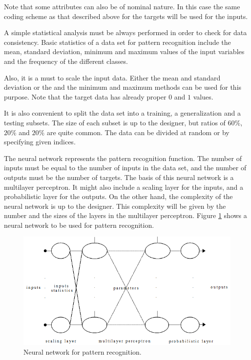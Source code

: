Note that some attributes can also be of nominal nature. 
In this case the same coding scheme as that described above for the targets will be used for the inputs. 

A simple statistical analysis must be always performed in order to check
for data consistency. Basic statistics of a data set for pattern recognition include the
mean, standard deviation, minimum and maximum values of the input variables and the frequency of the different classes. 

Also, it is a must to scale the input data. 
Either the mean and standard deviation or the and the minimum and maximum methods can be used for this purpose. 
Note that the target data has already proper $0$ and $1$ values. 

It is also convenient to split the data set into a training, a generalization and a testing subsets.
The size of each subset is up to the designer, but ratios of $60\%$, $20\%$ and $20\%$ are quite common. 
The data can be divided at random or by specifying given indices. 

The neural network represents the pattern recognition function. 
The number of inputs must be equal to the number 
of inputs in the data set, and the number of outputs must be the number of targets. 
The basis of this neural network is a multilayer perceptron. 
It might also include a scaling layer for the inputs, and a probabilistic layer for the outputs. 
On the other hand, the complexity of the neural network is up to the designer. 
This complexity will be given by the number and the sizes of the layers in the multilayer perceptron. 
Figure \ref{NeuralNetworkPatternRecognitionFigure} shows a neural network to be used for pattern recognition. 

\begin{figure}[h!]
\begin{center}
\includegraphics[width=1.2\textwidth]{pattern_recognition/neural_network_pattern_recognition.png}
\caption{Neural network for pattern recognition.}\label{NeuralNetworkPatternRecognitionFigure}
\end{center}
\end{figure}

